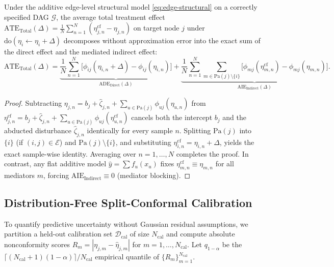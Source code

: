 \begin{proposition}
\label{prop:mediation}
Under the additive edge-level structural model \eqref{eq:edge-structural} on a correctly specified DAG $\mathcal{G}$, the average total treatment effect $\mathrm{ATE}_{\mathrm{Total}}(\Delta) = \frac{1}{N}\sum_{n=1}^N (\eta_{j,n}^{\mathrm{cf}} - \eta_{j,n})$ on target node $j$ under $\mathrm{do}(\eta_i \leftarrow \eta_i + \Delta)$ decomposes without approximation error into the exact sum of the direct effect and the mediated indirect effect:
\begin{equation}
  \mathrm{ATE}_{\mathrm{Total}}(\Delta)
  = \underbrace{\frac{1}{N}\sum_{n=1}^{N}\Big[\phi_{ij}(\eta_{i,n} + \Delta) - \phi_{ij}(\eta_{i,n})\Big]}_{\mathrm{ADE}_{\mathrm{Direct}}(\Delta)}
  + \underbrace{\frac{1}{N}\sum_{n=1}^{N}\sum_{m \in \mathrm{Pa}(j) \setminus \{i\}} \Big[\phi_{mj}(\eta_{m,n}^{\mathrm{cf}}) - \phi_{mj}(\eta_{m,n})\Big]}_{\mathrm{AIE}_{\mathrm{Indirect}}(\Delta)}.
\end{equation}
\end{proposition}

\begin{proof}
Subtracting $\eta_{j,n} = b_j + \hat{\zeta}_{j,n} + \sum_{u \in \mathrm{Pa}(j)} \phi_{uj}(\eta_{u,n})$ from $\eta_{j,n}^{\mathrm{cf}} = b_j + \hat{\zeta}_{j,n} + \sum_{u \in \mathrm{Pa}(j)} \phi_{uj}(\eta_{u,n}^{\mathrm{cf}})$ cancels both the intercept $b_j$ and the abducted disturbance $\hat{\zeta}_{j,n}$ identically for every sample $n$. Splitting $\mathrm{Pa}(j)$ into $\{i\}$ (if $(i, j) \in \mathcal{E}$) and $\mathrm{Pa}(j) \setminus \{i\}$, and substituting $\eta_{i,n}^{\mathrm{cf}} = \eta_{i,n} + \Delta$, yields the exact sample-wise identity. Averaging over $n = 1, \dots, N$ completes the proof. In contrast, any flat additive model $\hat{y} = \sum f_u(x_u)$ fixes $\eta_{m,n}^{\mathrm{cf}} \equiv \eta_{m,n}$ for all mediators $m$, forcing $\mathrm{AIE}_{\mathrm{Indirect}} \equiv 0$ (mediator blocking).
\end{proof}

\subsection{Distribution-Free Split-Conformal Calibration}
To quantify predictive uncertainty without Gaussian residual assumptions, we partition a held-out calibration set $\mathcal{D}_{\mathrm{cal}}$ of size $N_{\mathrm{cal}}$ and compute absolute nonconformity scores $R_m = |\eta_{j,m} - \hat{\eta}_{j,m}|$ for $m = 1, \dots, N_{\mathrm{cal}}$. Let $q_{1-\alpha}$ be the $\lceil (N_{\mathrm{cal}} + 1)(1 - \alpha) \rceil / N_{\mathrm{cal}}$ empirical quantile of $\{R_m\}_{m=1}^{N_{\mathrm{cal}}}$.

